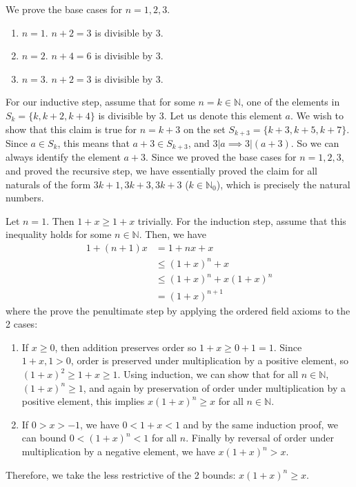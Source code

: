   \begin{exercise}
    We prove the base cases for $n = 1, 2, 3$. 
    \begin{enumerate}
      \item $n = 1$. $n+2 = 3$ is divisible by $3$. 
      \item $n = 2$. $n+4 = 6$ is divisible by $3$. 
      \item $n = 3$. $n+2 = 3$ is divisible by $3$. 
    \end{enumerate} 
    For our inductive step, assume that for some $n = k \in \mathbb{N}$, one of the elements in $S_k = \{k, k+2, k+4\}$ is divisible by $3$. Let us denote this element $a$. We wish to show that this claim is true for $n = k+3$ on the set $S_{k+3} = \{k+3, k+5, k+7\}$. Since $a \in S_k$, this means that $a+3 \in S_{k+3}$, and $3 | a \implies 3 | (a+3)$. So we can always identify the element $a+3$. Since we proved the base cases for $n=1, 2, 3$, and proved the recursive step, we have essentially proved the claim for all naturals of the form $3k+1, 3k+3, 3k+3$ ($k \in \mathbb{N}_0$), which is precisely the natural numbers. 
  \end{exercise}

  \begin{exercise}
    Let $n = 1$. Then $1 + x \geq 1 + x$ trivially. For the induction step, assume that this inequality holds for some $n \in \mathbb{N}$. Then, we have 
    \begin{align}
      1 + (n+1) x & = 1 + nx + x \\
                  & \leq (1+x)^n + x \\ 
                  & \leq (1+x)^n + x(1+x)^n \\
                  & = (1+x)^{n+1}
    \end{align} 
    where the prove the penultimate step by applying the ordered field axioms to the 2 cases: 
    \begin{enumerate}
      \item If $x \geq 0$, then addition preserves order so $1 + x \geq 0 + 1 = 1$. Since $1 + x, 1 > 0$, order is preserved under multiplication by a positive element, so $(1+x)^2 \geq 1+x \geq 1$. Using induction, we can show that for all $n \in \mathbb{N}$, $(1+x)^n \geq 1$, and again by preservation of order under multiplication by a positive element, this implies $x (1 + x)^n \geq x$ for all $n \in \mathbb{N}$. 
      \item If $0 > x > -1$, we have $0 < 1 + x < 1$ and by the same induction proof, we can bound $0 < (1+x)^n < 1$ for all $n$. Finally by reversal of order under multiplication by a negative element, we have $x (1+x)^n > x$. 
    \end{enumerate}
    Therefore, we take the less restrictive of the 2 bounds: $x(1+x)^n \geq x$. 
  \end{exercise}

